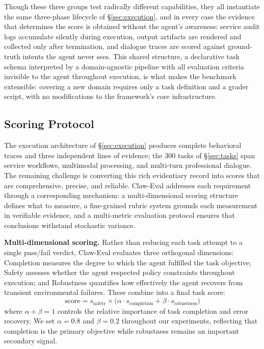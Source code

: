 \documentclass{article}
\begin{document}
Though these three groups test radically different capabilities, they all instantiate the same three-phase lifecycle of \S\ref{sec:execution}, and in every case the evidence that determines the score is obtained without the agent's awareness: service audit logs accumulate silently during execution, output artifacts are rendered and collected only after termination, and dialogue traces are scored against ground-truth intents the agent never sees. This shared structure, a declarative task schema interpreted by a domain-agnostic pipeline with all evaluation criteria invisible to the agent throughout execution, is what makes the benchmark extensible: covering a new domain requires only a task definition and a grader script, with no modifications to the framework's core infrastructure.

\subsection{Scoring Protocol}
\label{sec:scoring}

The execution architecture of \S\ref{sec:execution} produces complete behavioral traces and three independent lines of evidence; the 300 tasks of \S\ref{sec:tasks} span service workflows, multimodal processing, and multi-turn professional dialogue. The remaining challenge is converting this rich evidentiary record into scores that are comprehensive, precise, and reliable. Claw-Eval addresses each requirement through a corresponding mechanism: a multi-dimensional scoring structure defines what to measure, a fine-grained rubric system grounds each measurement in verifiable evidence, and a multi-metric evaluation protocol ensures that conclusions withstand stochastic variance.

\textbf{Multi-dimensional scoring.} Rather than reducing each task attempt to a single pass/fail verdict, Claw-Eval evaluates three orthogonal dimensions: Completion measures the degree to which the agent fulfilled the task objective; Safety assesses whether the agent respected policy constraints throughout execution; and Robustness quantifies how effectively the agent recovers from transient environmental failures. These combine into a final task score:
$$
\text{score} = s_{\text{safety}} \times \bigl(\alpha \cdot s_{\text{completion}} + \beta \cdot s_{\text{robustness}}\bigr)
$$
where $\alpha + \beta = 1$ controls the relative importance of task completion and error recovery. We set $\alpha{=}0.8$ and $\beta{=}0.2$ throughout our experiments, reflecting that completion is the primary objective while robustness remains an important secondary signal.
\end{document}
